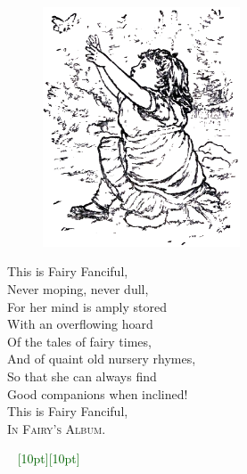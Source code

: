 \documentclass[oneside,12pt,english]{book}
\newcommand{\ornamento}{\vspace{2em}\noindent \textcolor{darkgreen}{\hrulefill~ \raisebox{-2.5pt}[10pt][10pt]{\leafright \decofourleft \decothreeleft  \aldineright \decotwo \floweroneleft \decoone   \floweroneright \decotwo \aldineleft\decothreeright \decofourright \leafleft} ~  \hrulefill \\ \vspace{2em}}}
\begin{document}
\begin{figure}
\centering
\includegraphics[height=2.8in]{fig02}
\end{figure}

This is Fairy Fanciful,\\
Never moping, never dull,\\
For her mind is amply stored\\
With an overflowing hoard\\
Of the tales of fairy times,\\
And of quaint old nursery rhymes,\\
So that she can always find\\
Good companions when inclined!\\
This is Fairy Fanciful,\\
\textsc{In Fairy's Album}.

\ornamento
\end{document}
